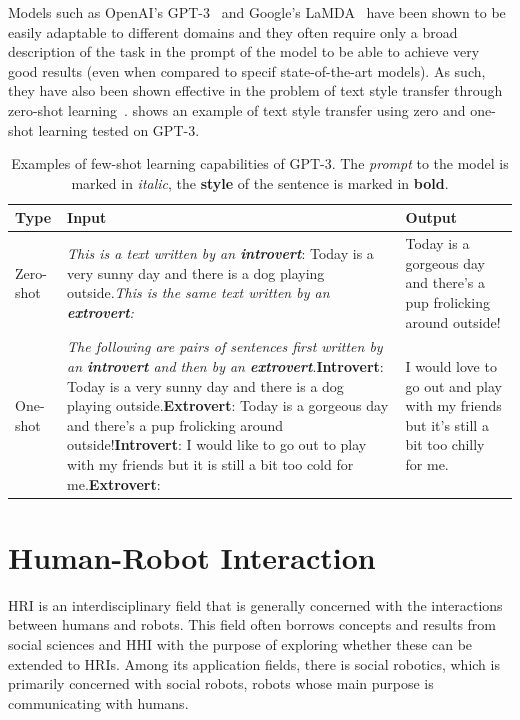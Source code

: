 \documentclass[nomenclature, english, biblatex]{kththesis}
\begin{document}
Models such as OpenAI's GPT-3~\cite{brown2020language} and Google's LaMDA~\cite{thoppilan2022lamda} have been shown to be easily adaptable to different domains and they often require only a broad description of the task in the prompt of the model to be able to achieve very good results (even when compared to specif state-of-the-art models). As such, they have also been shown effective in the problem of text style transfer through zero-shot learning~\cite{reif2021recipe}.  shows an example of text style transfer using zero and one-shot learning tested on GPT-3.
\begin{table}
    \centering
    \begin{adjustbox}{max width=\textwidth}
        \begin{tabular}{|l|p{}|p{}|}
        \hline
        Type & Input & Output \\
        \hline
        \hline
        Zero-shot & \textit{This is a text written by an \textbf{introvert}}: Today is a very sunny day and there is a dog playing outside.\newline \textit{This is the same text written by an \textbf{extrovert}: }& Today is a gorgeous day and there's a pup frolicking around outside! \\ 
        \hline
        One-shot & \textit{The following are pairs of sentences first written by an \textbf{introvert} and then by an \textbf{extrovert}}.\newline \textbf{Introvert}: Today is a very sunny day and there is a dog playing outside.\newline \textbf{Extrovert}: Today is a gorgeous day and there's a pup frolicking around outside!\newline \textbf{Introvert}: I would like to go out to play with my friends but it is still a bit too cold for me.\newline \textbf{Extrovert}: & I would love to go out and play with my friends but it's still a bit too chilly for me. \\ \hline
        \end{tabular}
    \end{adjustbox}
    \caption{Examples of few-shot learning capabilities of GPT-3. The \textit{prompt} to the model is marked in \textit{italic}, the \textbf{style} of the sentence is marked in \textbf{bold}.}
    \label{tab:gpt3_shots}
\end{table}

\section{Human-Robot Interaction}
\gls{HRI} is an interdisciplinary field that is generally concerned with the interactions between humans and robots. This field often borrows concepts and results from social sciences and \gls{HHI} with the purpose of exploring whether these can be extended to \glspl{HRI}. Among its application fields, there is social robotics, which is primarily concerned with social robots, robots whose main purpose is communicating with humans.
\end{document}
